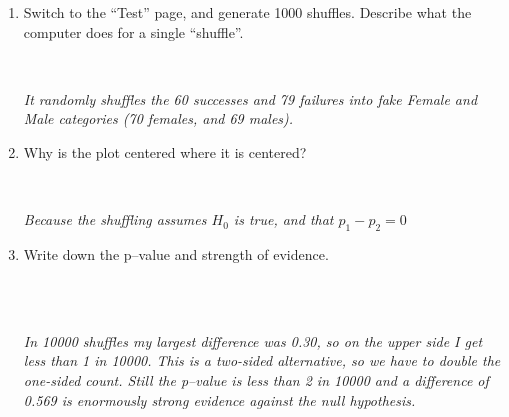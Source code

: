 \begin{enumerate}
\begin{enumerate}
   \item Switch to the ``Test'' page, and generate  1000
     shuffles. Describe what the  computer does for a single
     ``shuffle''. 
\begin{students}
 \ \   \vspace*{3cm}\\
\end{students}
\begin{key}
  {\it  It randomly shuffles the 60 successes and 79 failures into
    fake Female and Male categories (70 females, and 69 males).}
\end{key}

\item Why is the plot centered where it is centered?
\begin{students}
 \ \   \vspace{2cm}\\
\end{students}
\begin{key}
  {\it  Because the shuffling assumes $H_0$ is true, and that $p_1-p_2
    = 0$}
\end{key}



   \item Write down the p--value   and strength of evidence.
\begin{students}
 \\   \vspace{2cm}\\
\end{students}
\begin{key}
  {\it In 10000 shuffles my largest difference was 0.30, so on the
    upper side I get less than 1 in 10000. This is a two-sided
    alternative, so we have to double the one-sided count. Still the p--value
    is less than 2 in 10000 and a difference of 0.569 is enormously strong 
  evidence against the null hypothesis.    } \\
\end{key}


\end{enumerate}
\end{enumerate}
